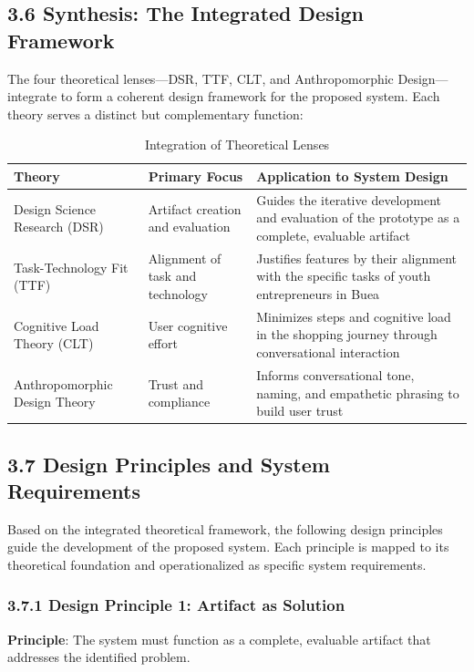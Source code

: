 \documentclass[12pt,a4paper]{article}
\begin{document}
\subsection{3.6 Synthesis: The Integrated Design Framework}

The four theoretical lenses---DSR, TTF, CLT, and Anthropomorphic Design---integrate to form a coherent design framework for the proposed system. Each theory serves a distinct but complementary function:

\begin{table}[h]
\centering
\caption{Integration of Theoretical Lenses}
\label{tab:integration}
\begin{tabular}{p{4cm}p{4cm}p{8cm}}
\toprule
\textbf{Theory} & \textbf{Primary Focus} & \textbf{Application to System Design} \\
\midrule
Design Science Research (DSR) & Artifact creation and evaluation & Guides the iterative development and evaluation of the prototype as a complete, evaluable artifact \\
Task-Technology Fit (TTF) & Alignment of task and technology & Justifies features by their alignment with the specific tasks of youth entrepreneurs in Buea \\
Cognitive Load Theory (CLT) & User cognitive effort & Minimizes steps and cognitive load in the shopping journey through conversational interaction \\
Anthropomorphic Design Theory & Trust and compliance & Informs conversational tone, naming, and empathetic phrasing to build user trust \\
\bottomrule
\end{tabular}
\end{table}

\subsection{3.7 Design Principles and System Requirements}

Based on the integrated theoretical framework, the following design principles guide the development of the proposed system. Each principle is mapped to its theoretical foundation and operationalized as specific system requirements.

\subsubsection{3.7.1 Design Principle 1: Artifact as Solution}

\textbf{Principle}: The system must function as a complete, evaluable artifact that addresses the identified problem.
\end{document}
